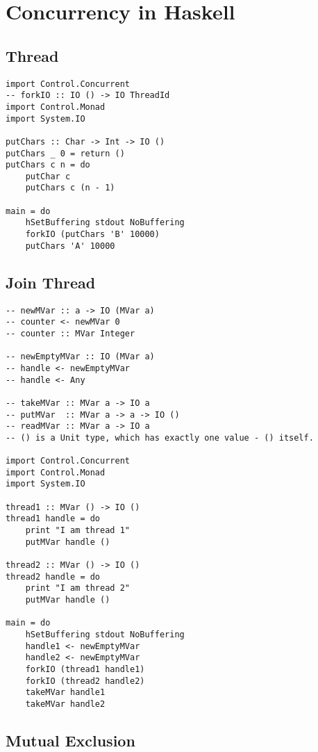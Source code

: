 \documentclass[twocolumn,landscape,10pt]{article}
\theoremstyle{definition}
\begin{document}
\newpage
\section{Concurrency in Haskell}

\subsection{Thread}

\begin{lstlisting}[Haskell]
import Control.Concurrent
-- forkIO :: IO () -> IO ThreadId
import Control.Monad
import System.IO

putChars :: Char -> Int -> IO ()
putChars _ 0 = return ()
putChars c n = do
    putChar c
    putChars c (n - 1)

main = do
    hSetBuffering stdout NoBuffering
    forkIO (putChars 'B' 10000)
    putChars 'A' 10000
\end{lstlisting} 

\subsection{Join Thread}

\begin{lstlisting}[Haskell]
-- newMVar :: a -> IO (MVar a)
-- counter <- newMVar 0
-- counter :: MVar Integer

-- newEmptyMVar :: IO (MVar a)
-- handle <- newEmptyMVar
-- handle <- Any

-- takeMVar :: MVar a -> IO a
-- putMVar  :: MVar a -> a -> IO ()
-- readMVar :: MVar a -> IO a
-- () is a Unit type, which has exactly one value - () itself.

import Control.Concurrent
import Control.Monad
import System.IO

thread1 :: MVar () -> IO ()
thread1 handle = do
    print "I am thread 1"
    putMVar handle ()

thread2 :: MVar () -> IO ()
thread2 handle = do
    print "I am thread 2"
    putMVar handle ()

main = do
    hSetBuffering stdout NoBuffering
    handle1 <- newEmptyMVar
    handle2 <- newEmptyMVar
    forkIO (thread1 handle1)
    forkIO (thread2 handle2)
    takeMVar handle1
    takeMVar handle2
\end{lstlisting} 

\subsection{Mutual Exclusion}
\end{document}

